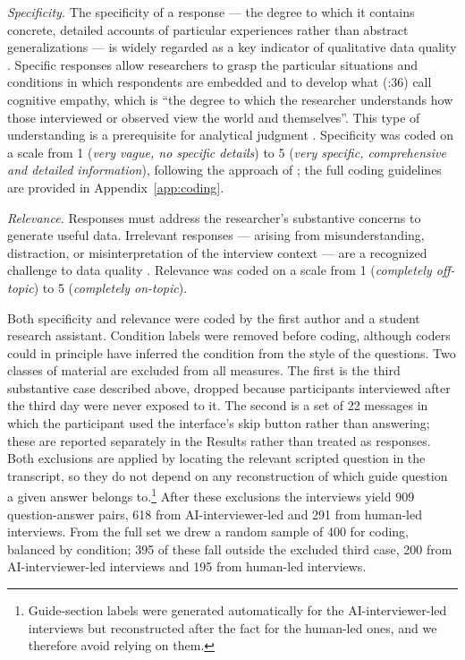 \documentclass[12pt]{article}
\newcommand{\AII}{AI-interviewer}
\begin{document}
\textit{Specificity.} The specificity of a response --- the degree to which it contains concrete, detailed accounts of particular experiences rather than abstract generalizations --- is widely regarded as a key indicator of qualitative data quality \citep{Gerson2020, Lareau2021, SmallCalarco2022, Weiss1995}. Specific responses allow researchers to grasp the particular situations and conditions in which respondents are embedded and to develop what \citeauthor{SmallCalarco2022} (\citeyear{SmallCalarco2022}:36) call cognitive empathy, which is ``the degree to which the researcher understands how those interviewed or observed view the world and themselves''. This type of understanding is a prerequisite for analytical judgment \citep{Lichterman2017}. Specificity was coded on a scale from 1 (\textit{very vague, no specific details}) to 5 (\textit{very specific, comprehensive and detailed information}), following the approach of \citet{Wuttke2024}; the full coding guidelines are provided in Appendix~\ref{app:coding}.

\textit{Relevance.} Responses must address the researcher's substantive concerns to generate useful data. Irrelevant responses --- arising from misunderstanding, distraction, or misinterpretation of the interview context --- are a recognized challenge to data quality \citep{Weiss1995}. Relevance was coded on a scale from 1 (\textit{completely off-topic}) to 5 (\textit{completely on-topic}).

Both specificity and relevance were coded by the first author and a student research assistant. Condition labels were removed before coding, although coders could in principle have inferred the condition from the style of the questions. Two classes of material are excluded from all measures. The first is the third substantive case described above, dropped because participants interviewed after the third day were never exposed to it. The second is a set of 22 messages in which the participant used the interface's skip button rather than answering; these are reported separately in the Results rather than treated as responses. Both exclusions are applied by locating the relevant scripted question in the transcript, so they do not depend on any reconstruction of which guide question a given answer belongs to.\footnote{Guide-section labels were generated automatically for the \AII{}-led interviews but reconstructed after the fact for the human-led ones, and we therefore avoid relying on them.} After these exclusions the interviews yield 909 question-answer pairs, 618 from \AII{}-led and 291 from human-led interviews. From the full set we drew a random sample of 400 for coding, balanced by condition; 395 of these fall outside the excluded third case, 200 from \AII{}-led interviews and 195 from human-led interviews.
\end{document}
